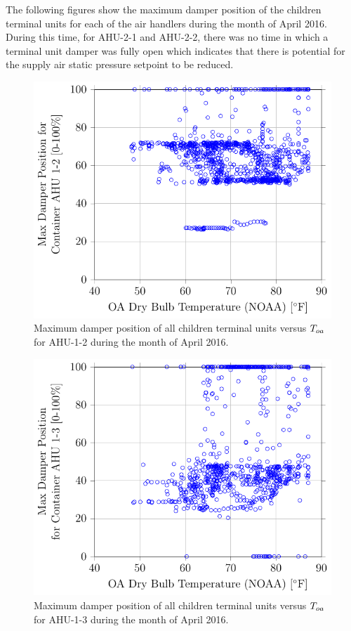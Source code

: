 The following figures show the maximum damper position of the children
terminal units for each of the air handlers during the month of April
2016. During this time, for AHU-2-1 and AHU-2-2, there was no time in
which a terminal unit damper was fully open which indicates that there
is potential for the supply air static pressure setpoint to be reduced.  

\newcommand{\MaxDampCaption}[1]{Maximum damper position of all children terminal units versus \(\oat{}\) for #1 during the month of April 2016.}

\begin{figure}
\centering
\includegraphics{Plots/MaximumDamperPosition-1-2.pdf} 
\caption{\MaxDampCaption{AHU-1-2}}
\label{fig:MaxDamperPositionforContainerAHU12vsOADryBulbTemperatureNOAA}
\end{figure}

\begin{figure}
\centering
\includegraphics{Plots/MaximumDamperPosition-1-3.pdf}
\caption{\MaxDampCaption{AHU-1-3}}
\label{fig:MaxDamperPositionforContainerAHU13vsOADryBulbTemperatureNOAA}
\end{figure}


